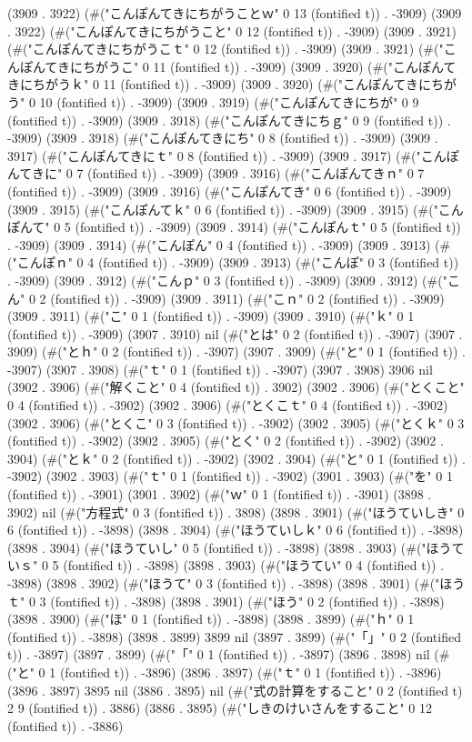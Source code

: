 (3909 . 3922) (#("こんぽんてきにちがうことｗ" 0 13 (fontified t)) . -3909) (3909 . 3922) (#("こんぽんてきにちがうこと" 0 12 (fontified t)) . -3909) (3909 . 3921) (#("こんぽんてきにちがうこｔ" 0 12 (fontified t)) . -3909) (3909 . 3921) (#("こんぽんてきにちがうこ" 0 11 (fontified t)) . -3909) (3909 . 3920) (#("こんぽんてきにちがうｋ" 0 11 (fontified t)) . -3909) (3909 . 3920) (#("こんぽんてきにちがう" 0 10 (fontified t)) . -3909) (3909 . 3919) (#("こんぽんてきにちが" 0 9 (fontified t)) . -3909) (3909 . 3918) (#("こんぽんてきにちｇ" 0 9 (fontified t)) . -3909) (3909 . 3918) (#("こんぽんてきにち" 0 8 (fontified t)) . -3909) (3909 . 3917) (#("こんぽんてきにｔ" 0 8 (fontified t)) . -3909) (3909 . 3917) (#("こんぽんてきに" 0 7 (fontified t)) . -3909) (3909 . 3916) (#("こんぽんてきｎ" 0 7 (fontified t)) . -3909) (3909 . 3916) (#("こんぽんてき" 0 6 (fontified t)) . -3909) (3909 . 3915) (#("こんぽんてｋ" 0 6 (fontified t)) . -3909) (3909 . 3915) (#("こんぽんて" 0 5 (fontified t)) . -3909) (3909 . 3914) (#("こんぽんｔ" 0 5 (fontified t)) . -3909) (3909 . 3914) (#("こんぽん" 0 4 (fontified t)) . -3909) (3909 . 3913) (#("こんぽｎ" 0 4 (fontified t)) . -3909) (3909 . 3913) (#("こんぽ" 0 3 (fontified t)) . -3909) (3909 . 3912) (#("こんｐ" 0 3 (fontified t)) . -3909) (3909 . 3912) (#("こん" 0 2 (fontified t)) . -3909) (3909 . 3911) (#("こｎ" 0 2 (fontified t)) . -3909) (3909 . 3911) (#("こ" 0 1 (fontified t)) . -3909) (3909 . 3910) (#("ｋ" 0 1 (fontified t)) . -3909) (3907 . 3910) nil (#("とは" 0 2 (fontified t)) . -3907) (3907 . 3909) (#("とｈ" 0 2 (fontified t)) . -3907) (3907 . 3909) (#("と" 0 1 (fontified t)) . -3907) (3907 . 3908) (#("ｔ" 0 1 (fontified t)) . -3907) (3907 . 3908) 3906 nil (3902 . 3906) (#("解くこと" 0 4 (fontified t)) . 3902) (3902 . 3906) (#("とくこと" 0 4 (fontified t)) . -3902) (3902 . 3906) (#("とくこｔ" 0 4 (fontified t)) . -3902) (3902 . 3906) (#("とくこ" 0 3 (fontified t)) . -3902) (3902 . 3905) (#("とくｋ" 0 3 (fontified t)) . -3902) (3902 . 3905) (#("とく" 0 2 (fontified t)) . -3902) (3902 . 3904) (#("とｋ" 0 2 (fontified t)) . -3902) (3902 . 3904) (#("と" 0 1 (fontified t)) . -3902) (3902 . 3903) (#("ｔ" 0 1 (fontified t)) . -3902) (3901 . 3903) (#("を" 0 1 (fontified t)) . -3901) (3901 . 3902) (#("ｗ" 0 1 (fontified t)) . -3901) (3898 . 3902) nil (#("方程式" 0 3 (fontified t)) . 3898) (3898 . 3901) (#("ほうていしき" 0 6 (fontified t)) . -3898) (3898 . 3904) (#("ほうていしｋ" 0 6 (fontified t)) . -3898) (3898 . 3904) (#("ほうていし" 0 5 (fontified t)) . -3898) (3898 . 3903) (#("ほうていｓ" 0 5 (fontified t)) . -3898) (3898 . 3903) (#("ほうてい" 0 4 (fontified t)) . -3898) (3898 . 3902) (#("ほうて" 0 3 (fontified t)) . -3898) (3898 . 3901) (#("ほうｔ" 0 3 (fontified t)) . -3898) (3898 . 3901) (#("ほう" 0 2 (fontified t)) . -3898) (3898 . 3900) (#("ほ" 0 1 (fontified t)) . -3898) (3898 . 3899) (#("ｈ" 0 1 (fontified t)) . -3898) (3898 . 3899) 3899 nil (3897 . 3899) (#("「」" 0 2 (fontified t)) . -3897) (3897 . 3899) (#("「" 0 1 (fontified t)) . -3897) (3896 . 3898) nil (#("と" 0 1 (fontified t)) . -3896) (3896 . 3897) (#("ｔ" 0 1 (fontified t)) . -3896) (3896 . 3897) 3895 nil (3886 . 3895) nil (#("式の計算をすること" 0 2 (fontified t) 2 9 (fontified t)) . 3886) (3886 . 3895) (#("しきのけいさんをすること" 0 12 (fontified t)) . -3886) 